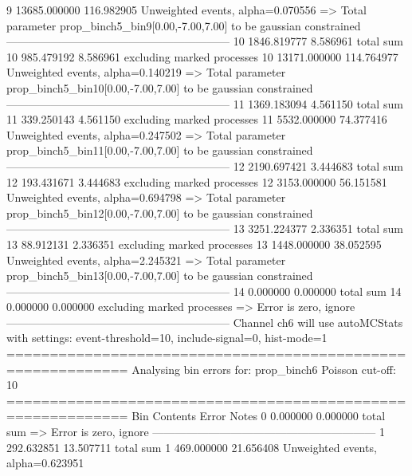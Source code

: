 9          13685.000000    116.982905      Unweighted events, alpha=0.070556
  => Total parameter prop_binch5_bin9[0.00,-7.00,7.00] to be gaussian constrained
------------------------------------------------------------
10         1846.819777     8.586961        total sum                     
10         985.479192      8.586961        excluding marked processes    
10         13171.000000    114.764977      Unweighted events, alpha=0.140219
  => Total parameter prop_binch5_bin10[0.00,-7.00,7.00] to be gaussian constrained
------------------------------------------------------------
11         1369.183094     4.561150        total sum                     
11         339.250143      4.561150        excluding marked processes    
11         5532.000000     74.377416       Unweighted events, alpha=0.247502
  => Total parameter prop_binch5_bin11[0.00,-7.00,7.00] to be gaussian constrained
------------------------------------------------------------
12         2190.697421     3.444683        total sum                     
12         193.431671      3.444683        excluding marked processes    
12         3153.000000     56.151581       Unweighted events, alpha=0.694798
  => Total parameter prop_binch5_bin12[0.00,-7.00,7.00] to be gaussian constrained
------------------------------------------------------------
13         3251.224377     2.336351        total sum                     
13         88.912131       2.336351        excluding marked processes    
13         1448.000000     38.052595       Unweighted events, alpha=2.245321
  => Total parameter prop_binch5_bin13[0.00,-7.00,7.00] to be gaussian constrained
------------------------------------------------------------
14         0.000000        0.000000        total sum                     
14         0.000000        0.000000        excluding marked processes    
  => Error is zero, ignore      
------------------------------------------------------------
Channel ch6 will use autoMCStats with settings: event-threshold=10, include-signal=0, hist-mode=1
============================================================
Analysing bin errors for: prop_binch6
Poisson cut-off: 10
============================================================
Bin        Contents        Error           Notes                         
0          0.000000        0.000000        total sum                     
  => Error is zero, ignore      
------------------------------------------------------------
1          292.632851      13.507711       total sum                     
1          469.000000      21.656408       Unweighted events, alpha=0.623951
